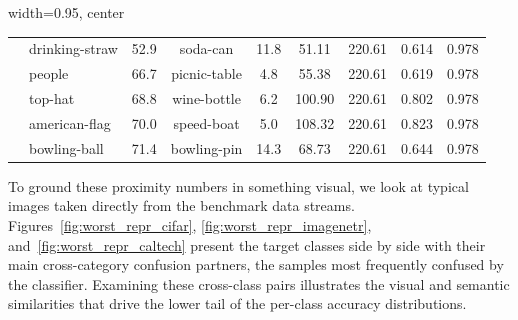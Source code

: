 \begin{table}[htbp]
\begin{adjustbox}{width=0.95\columnwidth, center}
\begin{tabular}{llccccccc}
			& drinking-straw & 52.9 & soda-can   & 11.8 &  51.11 & 220.61 & 0.614 & 0.978 \\
			& people        & 66.7 & picnic-table &   4.8 &  55.38 & 220.61 & 0.619 & 0.978 \\
			& top-hat       & 68.8 & wine-bottle &   6.2 & 100.90 & 220.61 & 0.802 & 0.978 \\
			& american-flag & 70.0 & speed-boat  &   5.0 & 108.32 & 220.61 & 0.823 & 0.978 \\
			& bowling-ball  & 71.4 & bowling-pin & 14.3 &  68.73 & 220.61 & 0.644 & 0.978 \\
			\bottomrule
		\end{tabular}
	\end{adjustbox}
\end{table}

To ground these proximity numbers in something visual, we look at typical images taken directly from the benchmark data streams. Figures~\ref{fig:worst_repr_cifar}, \ref{fig:worst_repr_imagenetr}, and~\ref{fig:worst_repr_caltech} present the target classes side by side with their main cross-category confusion partners, the samples most frequently confused by the classifier. Examining these cross-class pairs illustrates the visual and semantic similarities that drive the lower tail of the per-class accuracy distributions.

